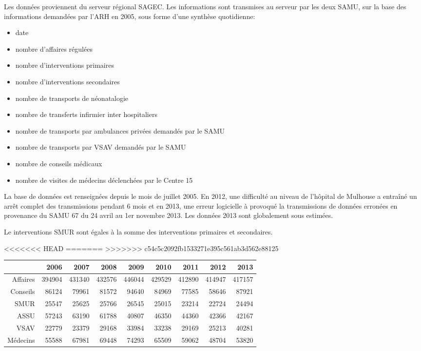 \documentclass[12pt,english,french,twoside]{book}\usepackage[]{graphicx}\usepackage[]{color}
\begin{document}
Les données proviennent du serveur régional SAGEC. Les informations sont transmises au serveur par les deux SAMU, sur la base des informations demandées par l'ARH en 2005, sous forme d'une synthèse quotidienne:
\begin{itemize}
  \item date
  \item nombre d'affaires régulées
  \item nombre d'interventions primaires
  \item nombre d'interventions secondaires
  \item nombre de transports de néonatalogie
  \item nombre de transferts infirmier inter hospitaliers
  \item nombre de transports par ambulances privées demandés par le SAMU
  \item nombre de transports par VSAV demandés par le SAMU
  \item nombre de conseils médicaux
  \item nombre de visites de médecins déclenchées par le Centre 15
\end{itemize}
La base de données est renseignées depuis le mois de juillet 2005. En 2012, une difficulté au niveau de l'hôpital de Mulhouse a entraîné un arrêt complet des transmissions pendant 6 mois et en 2013, une erreur logicielle à provoqué la transmissions de données erronées en provenance du SAMU 67 du 24 avril au 1er novembre 2013. Les données 2013 sont globalement sous estimées.

Le interventions SMUR sont égales à la somme des interventions primaires et secondaires.


<<<<<<< HEAD
=======
>>>>>>> c54c5c2092fb1533271e395c561ab3d562e88125
\begin{table}[ht]
\centering
\begin{tabular}{rrrrrrrrr}
  \hline
 & 2006 & 2007 & 2008 & 2009 & 2010 & 2011 & 2012 & 2013 \\ 
  \hline
Affaires & 394904 & 431340 & 432576 & 446044 & 429529 & 412890 & 414947 & 417157 \\ 
  Conseils & 86124 & 79961 & 81572 & 94640 & 84969 & 77585 & 58646 & 87921 \\ 
  SMUR & 25547 & 25625 & 25766 & 26545 & 25015 & 23214 & 22724 & 24494 \\ 
  ASSU & 57243 & 63190 & 61788 & 40807 & 46350 & 44360 & 42366 & 42167 \\ 
  VSAV & 22779 & 23379 & 29168 & 33984 & 33238 & 29169 & 25213 & 40281 \\ 
  Médecins & 55588 & 67981 & 69448 & 74293 & 65509 & 59062 & 48704 & 53820 \\ 
   \hline
\end{tabular}
\end{table}
\end{document}
